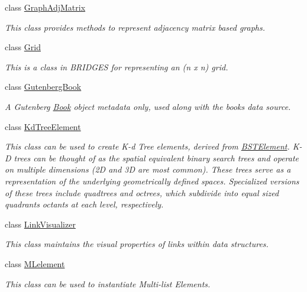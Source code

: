\begin{DoxyCompactItemize}
class \mbox{\hyperlink{classbridges_1_1_graph_adj_matrix}{Graph\+Adj\+Matrix}}
\begin{DoxyCompactList}\small\item\em This class provides methods to represent adjacency matrix based graphs. \end{DoxyCompactList}\item 
class \mbox{\hyperlink{classbridges_1_1_grid}{Grid}}
\begin{DoxyCompactList}\small\item\em This is a class in B\+R\+I\+D\+G\+ES for representing an (n x n) grid. \end{DoxyCompactList}\item 
class \mbox{\hyperlink{classbridges_1_1_gutenberg_book}{Gutenberg\+Book}}
\begin{DoxyCompactList}\small\item\em A Gutenberg \mbox{\hyperlink{classbridges_1_1_book}{Book}} object metadata only, used along with the books data source. \end{DoxyCompactList}\item 
class \mbox{\hyperlink{classbridges_1_1_kd_tree_element}{Kd\+Tree\+Element}}
\begin{DoxyCompactList}\small\item\em This class can be used to create K-\/d Tree elements, derived from \mbox{\hyperlink{classbridges_1_1_b_s_t_element}{B\+S\+T\+Element}}. K-\/D trees can be thought of as the spatial equivalent binary search trees and operate on multiple dimensions (2D and 3D are most common). These trees serve as a representation of the underlying geometrically defined spaces. Specialized versions of these trees include quadtrees and octrees, which subdivide into equal sized quadrants octants at each level, respectively. \end{DoxyCompactList}\item 
class \mbox{\hyperlink{classbridges_1_1_link_visualizer}{Link\+Visualizer}}
\begin{DoxyCompactList}\small\item\em This class maintains the visual properties of links within data structures. \end{DoxyCompactList}\item 
class \mbox{\hyperlink{classbridges_1_1_m_lelement}{M\+Lelement}}
\begin{DoxyCompactList}\small\item\em This class can be used to instantiate Multi-\/list Elements. \end{DoxyCompactList}\item 

\end{DoxyCompactItemize}
